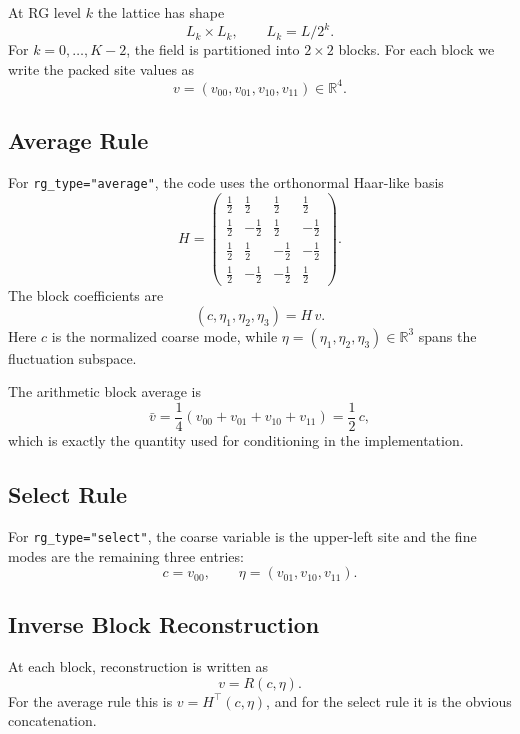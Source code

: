 \documentclass[11pt]{article}
\begin{document}
At RG level $k$ the lattice has shape
\[
L_k\times L_k,\qquad L_k=L/2^k.
\]
For $k=0,\dots,K-2$, the field is partitioned into $2\times 2$ blocks. For
each block we write the packed site values as
\[
v=(v_{00},v_{01},v_{10},v_{11})\in\mathbb{R}^4.
\]

\subsection{Average Rule}

For \texttt{rg\_type="average"}, the code uses the orthonormal Haar-like basis
\begin{equation}
H=
\begin{pmatrix}
\tfrac12 & \tfrac12 & \tfrac12 & \tfrac12 \\
\tfrac12 & -\tfrac12 & \tfrac12 & -\tfrac12 \\
\tfrac12 & \tfrac12 & -\tfrac12 & -\tfrac12 \\
\tfrac12 & -\tfrac12 & -\tfrac12 & \tfrac12
\end{pmatrix}.
\end{equation}
The block coefficients are
\begin{equation}
(c,\eta_1,\eta_2,\eta_3)=H\,v.
\end{equation}
Here $c$ is the normalized coarse mode, while
$\eta=(\eta_1,\eta_2,\eta_3)\in\mathbb{R}^3$ spans the fluctuation subspace.

The arithmetic block average is
\begin{equation}
\bar v = \frac{1}{4}(v_{00}+v_{01}+v_{10}+v_{11})=\frac12\,c,
\end{equation}
which is exactly the quantity used for conditioning in the implementation.

\subsection{Select Rule}

For \texttt{rg\_type="select"}, the coarse variable is the upper-left site and
the fine modes are the remaining three entries:
\begin{equation}
c=v_{00},\qquad \eta=(v_{01},v_{10},v_{11}).
\end{equation}

\subsection{Inverse Block Reconstruction}

At each block, reconstruction is written as
\begin{equation}
v = R(c,\eta).
\end{equation}
For the average rule this is $v=H^\top(c,\eta)$, and for the select rule it is
the obvious concatenation.
\end{document}
